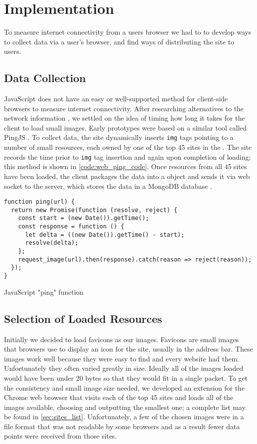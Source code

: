 \section{Implementation}\label{sec:web_ping_impl}

To measure internet connectivity from a users browser we had to to develop ways to collect data via a user's browser, and find ways of distributing the site to users.

\subsection{Data Collection}
JavaScript does not have an easy or well-supported method for client-side browsers to measure internet connectivity. After researching alternatives to the network information \api, we settled on the idea of timing how long it takes for the client to load small images. Early prototypes were based on a similar tool called PingJS \cite{Frederic2016a}. To collect data, the site dynamically inserts \html \texttt{img} tags pointing to a number of small resources, each owned by one of the top 45 sites in the \us. The site records the time prior to \texttt{img} tag insertion and again upon completion of loading; this method is shown in \cref{code:web_ping_code}. Once resources from all 45 sites have been loaded, the client packages the data into a \json object and sends it via web socket to the server, which stores the data in a MongoDB database \cite{MongoDB2019a}. 

\begin{code}[htb]
    \centering
    \small
    \begin{verbatim}
function ping(url) {
  return new Promise(function (resolve, reject) {
    const start = (new Date()).getTime();
    const response = function () {
      let delta = ((new Date()).getTime() - start);
      resolve(delta);
    };
    request_image(url).then(response).catch(reason => reject(reason));
  });
}
    \end{verbatim}
    \caption{JavaScript "ping" function}
    \label{code:web_ping_code}
\end{code}


\subsection{Selection of Loaded Resources}
Initially we decided to load favicons as our images. Favicons are small images that browsers use to display an icon for the site, usually in the address bar. These images work well because they were easy to find and every website had them. Unfortunately they often varied greatly in size. Ideally all of the images loaded would have been under 20 bytes so that they would fit in a single \tcp packet. To get the consistency and small image size needed, we developed an extension for the Chrome web browser that visits each of the top 45 sites and loads all of the images available, choosing and outputting the smallest one; a complete list may be found in \cref{sec:sites_list}. Unfortunately, a few of the chosen images were in a file format that was not readable by some browsers and as a result fewer data points were received from those sites.

